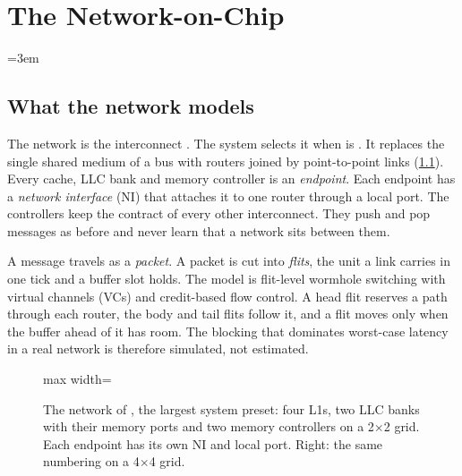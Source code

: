 \chapter{The Network-on-Chip}\label{ch:noc}
\begingroup\emergencystretch=3em


\section{What the network models}\label{sec:noc-overview}

The network is the interconnect . The system  selects it
when  is . It replaces the single shared medium of a bus with routers
joined by point-to-point links (\cref{fig:noc-system}). Every cache, LLC bank and memory
controller is an \emph{endpoint}. Each endpoint has a \emph{network interface} (NI) that attaches
it to one router through a local port. The controllers keep the 
contract of every other interconnect. They push and pop messages as before and never learn that a
network sits between them.

A message travels as a \emph{packet}. A packet is cut into \emph{flits}, the unit a link carries
in one tick and a buffer slot holds. The model is flit-level wormhole switching with virtual
channels (VCs) and credit-based flow control. A head flit reserves a path through each router,
the body and tail flits follow it, and a flit moves only when the buffer ahead of it has room.
The blocking that dominates worst-case latency in a real network is therefore simulated, not
estimated.

\begin{figure}[htbp]\centering
\begin{adjustbox}{max width=\textwidth}\end{adjustbox}
\caption{The network of , the largest system preset: four L1s,
two LLC banks with their memory ports and two memory controllers on a 2$\times$2 grid. Each
endpoint has its own NI and local port. Right: the same numbering on a 4$\times$4 grid.}
\label{fig:noc-system}
\end{figure}

